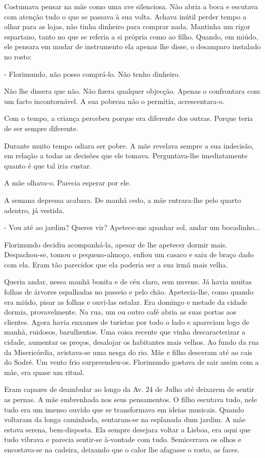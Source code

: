 Costumava pensar na mãe como uma ave silenciosa. Não abria a boca e
escutava com atenção tudo o que se passava à sua volta. Achava inútil
perder tempo a olhar para as lojas, não tinha dinheiro para comprar
nada. Mantinha um rigor espartano, tanto no que se referia a si própria
como ao filho. Quando, em miúdo, ele pensara em mudar de instrumento ela
apenas lhe disse, o desamparo instalado no rosto:

- Florimundo, não posso comprá-lo. Não tenho dinheiro.

Não lhe dissera que não. Não fizera qualquer objecção. Apenas o
confrontara com um facto incontornável. A sua pobreza não o permitia,
acrescentara-o.

Com o tempo, a criança percebeu porque era diferente dos outras. Porque
teria de ser sempre diferente.

Durante muito tempo odiara ser pobre. A mãe revelava sempre a sua
indecisão, em relação a todas as decisões que ele tomava. Perguntava-lhe
imediatamente quanto é que tal iria custar.

A mãe olhava-o. Parecia esperar por ele.

A semana depressa acabara. De manhã cedo, a mãe entrara-lhe pelo quarto
adentro, já vestida.

- Vou até ao jardim? Queres vir? Apetece-me apanhar sol, andar um
bocadinho...

Florimundo decidiu acompanhá-la, apesar de lhe apetecer dormir mais.
Despachou-se, tomou o pequeno-almoço, enfiou um casaco e saiu de braço
dado com ela. Eram tão parecidos que ela poderia ser a sua irmã mais
velha.

Queria andar, nessa manhã bonita e de céu claro, sem nuvens. Já havia
muitas folhas de árvores espalhadas no passeio e pelo chão.
Apetecia-lhe, como quando era miúdo, pisar as folhas e ouvi-las estalar.
Era domingo e metade da cidade dormia, provavelmente. Na rua, um ou
outro café abria as suas portas aos clientes. Agora havia enxames de
turistas por todo o lado e apareciam logo de manhã, ruidosos,
barulhentos. Uma coisa recente que vinha descaracterizar a cidade,
aumentar os preços, desalojar os habitantes mais velhos. Ao fundo da rua
da Misericórdia, avistava-se uma nesga do rio. Mãe e filho desceram até
ao cais do Sodré. Um vento frio surpreendeu-os. Florimundo gostava de
sair assim com a mãe, era quase um ritual.

Eram capazes de deambular ao longo da Av. 24 de Julho até deixarem de
sentir as pernas. A mãe embrenhada nos seus pensamentos. O filho
escutava tudo, nele tudo era um imenso ouvido que se transformava em
ideias musicais. Quando voltaram da longa caminhada, sentaram-se na
esplanada dum jardim. A mãe estava serena, bem-disposta. Ela sempre
desejara voltar a Lisboa, era aqui que tudo vibrava e parecia sentir-se
à-vontade com tudo. Semicerrava os olhos e encostava-se na cadeira,
deixando que o calor lhe afagasse o rosto, as faces.

